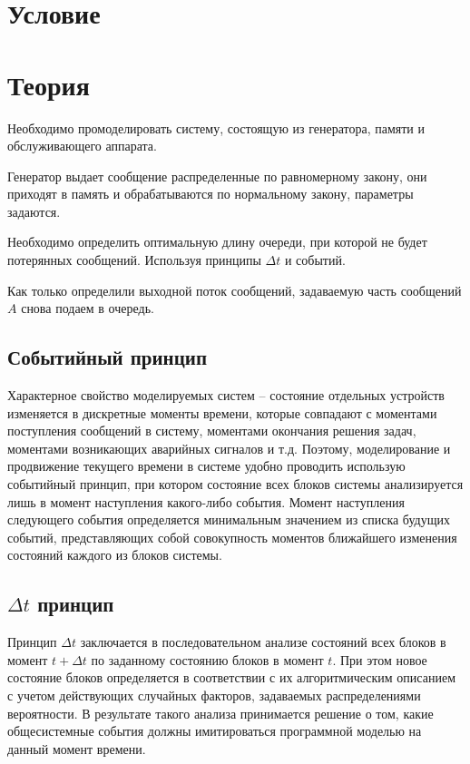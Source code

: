 \section{Условие}

\section{Теория}

Необходимо промоделировать систему, состоящую из генератора, памяти и
обслуживающего аппарата.

Генератор выдает сообщение распределенные по равномерному закону, они приходят в память и обрабатываются по нормальному закону, параметры задаются.

Необходимо определить оптимальную длину очереди, при которой не будет потерянных сообщений. Используя принципы $\Delta t$ и событий.

Как только определили выходной поток сообщений, задаваемую часть сообщений $A$ снова подаем в очередь.

\subsection{Событийный принцип}

Характерное свойство моделируемых систем – состояние отдельных устройств изменяется в дискретные моменты времени, которые совпадают с моментами поступления сообщений в систему, моментами окончания решения задач, моментами возникающих аварийных сигналов и т.д. Поэтому, моделирование и продвижение текущего времени в системе удобно проводить использую событийный принцип, при котором состояние всех блоков системы анализируется лишь в момент наступления какого-либо события. Момент наступления следующего события определяется минимальным значением из списка будущих событий, представляющих собой совокупность моментов ближайшего изменения состояний каждого из блоков системы.

\subsection{$\Delta t$ принцип}

Принцип $\Delta t$ заключается в последовательном анализе состояний всех блоков в момент $t + \Delta t$ по заданному состоянию блоков в момент $t$. При этом новое состояние блоков определяется в соответствии с их алгоритмическим описанием с учетом действующих случайных факторов, задаваемых распределениями вероятности. В результате такого анализа принимается решение о том, какие общесистемные события должны имитироваться программной моделью на данный момент времени.

